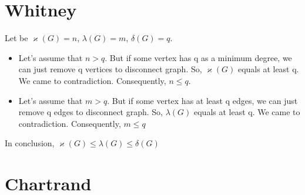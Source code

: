 \documentclass[12pt, letterpaper]{article}
\begin{document}
\section{Whitney}
Let be \begin{math}\varkappa(G) = n\end{math},
\begin{math}\lambda(G) = m \end{math},
\begin{math}\delta(G) = q \end{math}.
\begin{itemize}
  \item Let's assume that \begin{math} n > q \end{math}. But if some vertex has q as a minimum degree, we can just remove q vertices to disconnect graph. So, \begin{math}\varkappa(G)\end{math} equals at least q. We came to contradiction. Consequently, \begin{math} n \leq q \end{math}.
  \item Let's assume that \begin{math} m > q \end{math}. But if some vertex has at least q edges, we can just remove q edges to disconnect graph. So, \begin{math}\lambda(G)\end{math} equals at least q. We came to contradiction. Consequently, \begin{math} m \leq q \end{math}
\end{itemize}
In conclusion, \begin{math} \varkappa(G) \leq \lambda(G) \leq \delta(G)\end{math}

\section{Chartrand}
\end{document}
